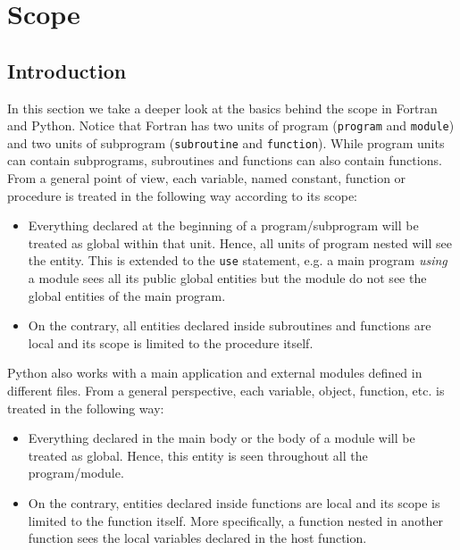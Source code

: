 \chapter{Scope} 
    \vspace{-1cm}
    \section{Introduction}

In this section we take a deeper look at the basics behind the scope in Fortran and Python. 
Notice that Fortran has two units of program (\texttt{program} and \texttt{module}) and 
two units of subprogram (\texttt{subroutine} and \texttt{function}).
While program units can contain subprograms, subroutines and functions can also contain functions. 
From a general point of view, each variable, named constant, function or procedure is treated in the following way according to its scope:
\vspace{-0.5cm}
\begin{itemize}[noitemsep]
    \item Everything declared at the beginning of a program/subprogram will be treated as global within that unit. 
    Hence, all units of program nested will see the entity.
    This is extended to the \texttt{use} statement, e.g. a main program \textit{using} a module sees all its public global entities but the module do not see the global entities of the main program. 
    
    \item On the contrary, all entities declared inside subroutines and functions are local and its scope is limited to the procedure itself. 
\end{itemize}

Python also works with a main application and external modules defined in different files. 
From a general perspective, each variable, object, function, etc. is treated in the following way:
\vspace{-0.5cm}
\begin{itemize}[noitemsep]
    \item Everything declared in the main body or the body of a module will be treated as global. 
    Hence, this entity is seen throughout all the program/module.
    
    \item On the contrary, entities declared inside functions are local and its scope is limited to the function itself. 
    More specifically, a function nested in another function sees the local variables declared in the host function.
\end{itemize}
    


